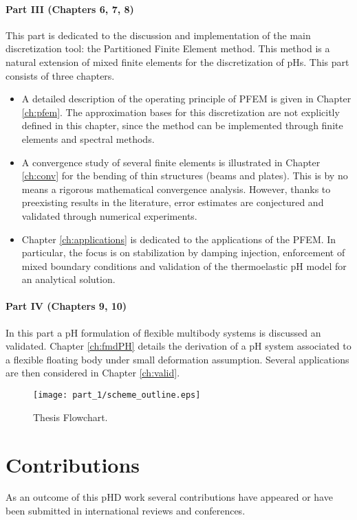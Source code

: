 \paragraph{Part III (Chapters 6, 7, 8)} This part is dedicated to the discussion and implementation of the main discretization tool: the Partitioned Finite Element method. This method is a natural extension of mixed finite elements for the discretization of pHs. This part consists of three chapters.
\begin{itemize}
	\item A detailed description of the operating principle of PFEM is given in Chapter \ref{ch:pfem}. The approximation bases for this discretization are not explicitly defined in this chapter, since the method can be implemented through finite elements and spectral methods.
	\item A convergence study of several finite elements is illustrated in Chapter \ref{ch:conv} for the bending of thin structures (beams and plates). This is by no means a rigorous mathematical convergence analysis. However, thanks to preexisting results in the literature, error estimates are conjectured and validated through numerical experiments.
	\item Chapter \ref{ch:applications} is dedicated to the applications of the PFEM. In particular, the focus is on stabilization by damping injection, enforcement of mixed boundary conditions and validation of the thermoelastic pH model for an analytical solution.
\end{itemize}
 
\paragraph{Part IV (Chapters 9, 10)} In this part a pH formulation of flexible multibody systems is discussed an validated. Chapter \ref{ch:fmdPH} details the derivation of a pH system associated to a flexible floating body under small deformation assumption. Several applications are then considered in Chapter \ref{ch:valid}.


\begin{sidewaysfigure}
	\centering
	\texttt{[image: part\_1/scheme\_outline.eps]}%
	\caption[]{Thesis Flowchart.}%
	\label{fig:flowchart}%
\end{sidewaysfigure}

\section{Contributions}
As an outcome of this pHD work several contributions have appeared or have been submitted in international reviews and conferences. \\

